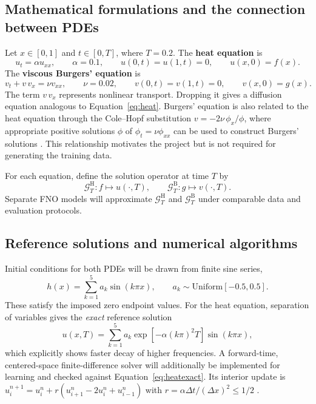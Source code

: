 \documentclass{article}
\begin{document}
\subsection{Mathematical formulations and the connection between PDEs}
Let $x\in[0,1]$ and $t\in[0,T]$, where $T=0.2$. The \textbf{heat equation} is
\begin{equation}
 u_t=\alpha u_{xx},\qquad \alpha=0.1,\qquad
 u(0,t)=u(1,t)=0,\qquad u(x,0)=f(x).
 \label{eq:heat}
\end{equation}
The \textbf{viscous Burgers' equation} is
\begin{equation}
 v_t+v\,v_x=\nu v_{xx},\qquad \nu=0.02,\qquad
 v(0,t)=v(1,t)=0,\qquad v(x,0)=g(x).
 \label{eq:burgers}
\end{equation}
The term $v\,v_x$ represents nonlinear transport. Dropping it gives a diffusion equation analogous to Equation~\eqref{eq:heat}. Burgers' equation is also related to the heat equation through the Cole--Hopf substitution $v=-2\nu\,\phi_x/\phi$, where appropriate positive solutions $\phi$ of $\phi_t=\nu\phi_{xx}$ can be used to construct Burgers' solutions \citep{hopf1950,cole1951}. This relationship motivates the project but is not required for generating the training data.

For each equation, define the solution operator at time $T$ by
\begin{equation}
 \mathcal G_T^{\mathrm H}: f\mapsto u(\cdot,T),\qquad
 \mathcal G_T^{\mathrm B}: g\mapsto v(\cdot,T).
 \label{eq:operators}
\end{equation}
Separate FNO models will approximate $\mathcal G_T^{\mathrm H}$ and $\mathcal G_T^{\mathrm B}$ under comparable data and evaluation protocols.

\subsection{Reference solutions and numerical algorithms}
Initial conditions for both PDEs will be drawn from finite sine series,
\begin{equation}
 h(x)=\sum_{k=1}^{5}a_k\sin(k\pi x),\qquad a_k\sim\mathrm{Uniform}[-0.5,0.5].
 \label{eq:init}
\end{equation}
These satisfy the imposed zero endpoint values. For the heat equation, separation of variables gives the \emph{exact} reference solution
\begin{equation}
 u(x,T)=\sum_{k=1}^{5}a_k\exp[-\alpha(k\pi)^2T]\sin(k\pi x),
 \label{eq:heatexact}
\end{equation}
which explicitly shows faster decay of higher frequencies. A forward-time, centered-space finite-difference solver will additionally be implemented for learning and checked against Equation~\eqref{eq:heatexact}. Its interior update is $u_i^{n+1}=u_i^n+r(u_{i+1}^n-2u_i^n+u_{i-1}^n)$ with $r=\alpha\Delta t/(\Delta x)^2\leq 1/2$ \citep{leveque2007finite}.
\end{document}
